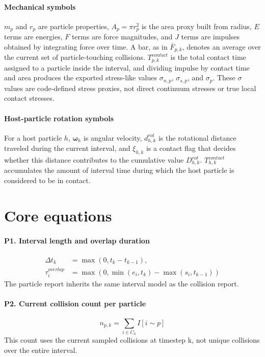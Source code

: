 \documentclass[11pt,a4paper]{article}
\begin{document}
\paragraph{Mechanical symbols}
$m_p$ and $r_p$ are particle properties, $A_p = \pi r_p^2$ is the area proxy built from radius, $E$ terms are energies, $F$ terms are force magnitudes, and $J$ terms are impulses obtained by integrating force over time.
A bar, as in $\bar{F}_{p,k}$, denotes an average over the current set of particle-touching collisions.
$T_{p,k}^{contact}$ is the total contact time assigned to a particle inside the interval, and dividing impulse by contact time and area produces the exported stress-like values $\sigma_{n,p}$, $\sigma_{s,p}$, and $\sigma_p$.
These $\sigma$ values are code-defined stress proxies, not direct continuum stresses or true local contact stresses.

\paragraph{Host-particle rotation symbols}
For a host particle $h$, $\boldsymbol{\omega}_h$ is angular velocity, $d_{h,k}^{rot}$ is the rotational distance traveled during the current interval, and $\xi_{h,k}$ is a contact flag that decides whether this distance contributes to the cumulative value $D_{h,k}^{rot}$.
$T_{h,k}^{contact}$ accumulates the amount of interval time during which the host particle is considered to be in contact.

\section*{Core equations}
\paragraph{P1. Interval length and overlap duration}
\[
\begin{aligned}
\Delta t_k &= \max(0, t_k - t_{k-1}), \\
\tau_i^{overlap} &= \max\!\left(0, \min(e_i, t_k) - \max(s_i, t_{k-1})\right)
\end{aligned}
\]
The particle report inherits the same interval model as the collision report.

\paragraph{P2. Current collision count per particle}
\[
n_{p,k} = \sum_{i \in C_k} I[i \sim p]
\]
This count uses the current sampled collisions at timestep k, not unique collisions over the entire interval.
\end{document}
